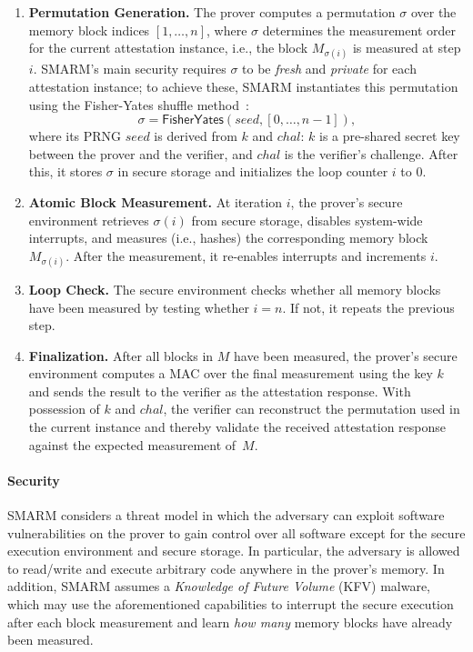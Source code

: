 \documentclass{ieeeaccess}
\begin{document}
\begin{enumerate}
    \item \textbf{Permutation Generation.}
    The prover computes a permutation $\sigma$ over the memory block indices $[1,\ldots,n]$, where $\sigma$ determines the measurement order for the current attestation instance, i.e., the block $M_{\sigma(i)}$ is measured at step $i$.
    SMARM's main security requires $\sigma$ to be \emph{fresh} and \emph{private} for each attestation instance;
    to achieve these, SMARM instantiates this permutation using the Fisher-Yates shuffle method~\cite{fisherYates}:
    \[
        \sigma = \mathsf{FisherYates}(seed, [0,\ldots,n-1]),
    \]
    where its PRNG $seed$ is derived from $k$ and $chal$: $k$ is a pre-shared secret key between the prover and the verifier, and $chal$ is the verifier’s challenge.
    After this, it stores $\sigma$ in secure storage and initializes the loop counter $i$ to $0$.

    \item \textbf{Atomic Block Measurement.}
    At iteration $i$, the prover's secure environment retrieves $\sigma(i)$ from secure storage, disables system-wide interrupts, and measures (i.e., hashes) the corresponding memory block $M_{\sigma(i)}$.
    After the measurement, it re-enables interrupts and increments $i$.

    \item \textbf{Loop Check.}
    The secure environment checks whether all memory blocks have been measured by testing whether $i = n$.
    If not, it repeats the previous step.

    \item \textbf{Finalization.}
    After all blocks in $M$ have been measured, the prover's secure environment computes a MAC over the final measurement using the key $k$ and sends the result to the verifier as the attestation response.
    With possession of $k$ and $chal$, the verifier can reconstruct the permutation used in the current instance and thereby validate the received attestation response against the expected measurement of~$M$.
\end{enumerate}

\paragraph{\textbf{Security}}
SMARM considers a threat model in which the adversary can exploit software vulnerabilities on the prover to gain control over all software except for the secure execution environment and secure storage.
In particular, the adversary is allowed to read/write and execute arbitrary code anywhere in the prover's memory.
In addition, SMARM assumes a \emph{Knowledge of Future Volume} (KFV) malware, which may use the aforementioned capabilities to interrupt the secure execution after each block measurement and learn \emph{how many} memory blocks have already been measured.
\end{document}

